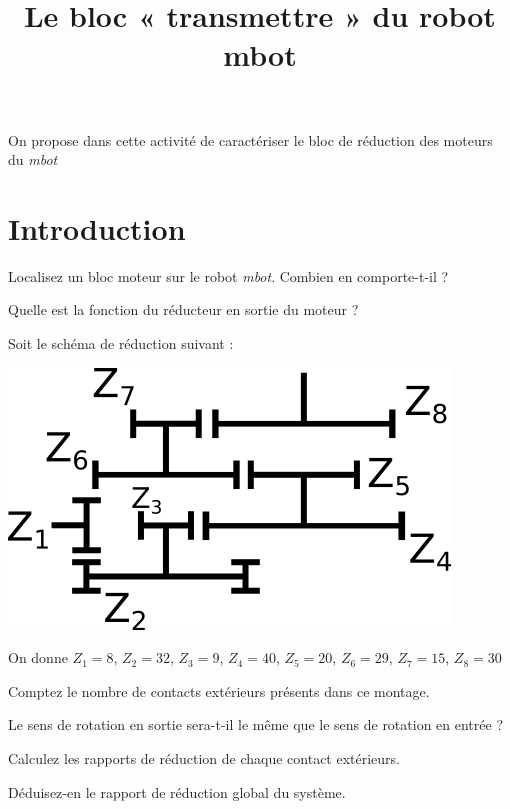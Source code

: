\documentclass[10pt,fleqn]{article} %
\title{Le bloc « transmettre » du robot mbot}
\date{}
\begin{document}
\maketitle
\chapterimage{}
%
\begin{obj}
  On propose dans cette activité de caractériser le bloc de réduction des moteurs du \textit{mbot}
\end{obj}
\section{Introduction}

\begin{question}
  Localisez un bloc moteur sur le robot \textit{mbot}. Combien en comporte-t-il ?
\end{question}
\begin{question}
  Quelle est la fonction du réducteur en sortie du moteur ?
\end{question}

Soit le schéma de réduction suivant :
\begin{center}
  \includegraphics[width=.4\textwidth]{images/engrenages_mbot}
\end{center}
On donne $Z_1 = 8$, $Z_2 = 32$, $Z_3 = 9$, $Z_4 = 40$, $Z_5 = 20$, $Z_6 = 29$, $Z_7 = 15$, $Z_8 = 30$
\begin{question}
Comptez le nombre de contacts extérieurs présents dans ce montage.
\end{question}
\begin{question}
  Le sens de rotation en sortie sera-t-il le même que le sens de rotation en entrée ?
\end{question}
\begin{question}
  Calculez les rapports de réduction de chaque contact extérieurs.
\end{question}
\begin{question}
  Déduisez-en le rapport de réduction global du système.
\end{question}
\end{document}
